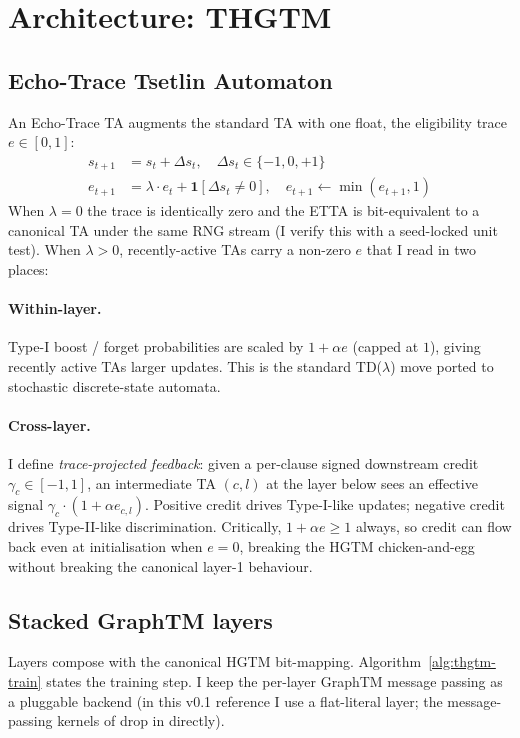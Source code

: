 \documentclass[11pt]{article}
\begin{document}
\section{Architecture: THGTM}

\subsection{Echo-Trace Tsetlin Automaton}

An Echo-Trace TA augments the standard TA with one float, the eligibility trace $e \in [0, 1]$:
\begin{align}
s_{t+1} &= s_t + \Delta s_t, \quad \Delta s_t \in \{-1, 0, +1\} \\
e_{t+1} &= \lambda \cdot e_t + \mathbf{1}[\Delta s_t \neq 0], \quad e_{t+1} \leftarrow \min(e_{t+1}, 1)
\end{align}
When $\lambda = 0$ the trace is identically zero and the ETTA is bit-equivalent to a canonical TA under the same RNG stream (I verify this with a seed-locked unit test).  When $\lambda > 0$, recently-active TAs carry a non-zero $e$ that I read in two places:

\paragraph{Within-layer.}  Type-I boost / forget probabilities are scaled by $1 + \alpha e$ (capped at $1$), giving recently active TAs larger updates.  This is the standard TD($\lambda$) move ported to stochastic discrete-state automata.

\paragraph{Cross-layer.}  I define \emph{trace-projected feedback}: given a per-clause signed downstream credit $\gamma_c \in [-1, 1]$, an intermediate TA $(c, l)$ at the layer below sees an effective signal $\gamma_c \cdot (1 + \alpha e_{c,l})$.  Positive credit drives Type-I-like updates; negative credit drives Type-II-like discrimination.  Critically, $1 + \alpha e \geq 1$ always, so credit can flow back even at initialisation when $e = 0$, breaking the HGTM chicken-and-egg without breaking the canonical layer-1 behaviour.

\subsection{Stacked GraphTM layers}

Layers compose with the canonical HGTM bit-mapping.  Algorithm~\ref{alg:thgtm-train} states the training step.  I keep the per-layer GraphTM message passing as a pluggable backend (in this v0.1 reference I use a flat-literal layer; the message-passing kernels of \citealp{granmo2025graphtm} drop in directly).
\end{document}

